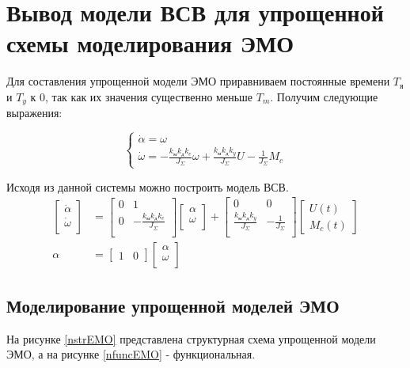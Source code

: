 \documentclass[a4paper, 12pt]{article}
\begin{document}
\section{Вывод модели ВСВ для упрощенной схемы моделирования ЭМО}
Для составления упрощенной модели ЭМО приравниваем постоянные времени $T_\text{я}$ и $T_y$ к 0, так как их значения существенно меньше $T_m$. Получим следующие выражения:

\begin{equation}
\begin{cases}
\dot{\alpha} = \omega \\
\dot{\omega} = -\frac{k_\text{м}k_\text{д}k_e}{J_\Sigma}\omega + \frac{k_\text{м}k_\text{д}k_y}{J_\Sigma}U - \frac{1}{J_\Sigma}M_c
\end{cases}
\end{equation}

Исходя из данной системы можно построить модель ВСВ.
\begin{align}
\begin{bmatrix}
\dot{\alpha} \\
\dot{\omega} \\
\end{bmatrix} & = 
\begin{bmatrix}
0 & 1 \\
0 & -\frac{k_\text{м}k_\text{д}k_e}{J_\Sigma} \\
\end{bmatrix}
\begin{bmatrix}
\alpha \\
\omega \\
\end{bmatrix} + 
\begin{bmatrix}
0 & 0 \\
\frac{k_\text{м}k_\text{д}k_y}{J_\Sigma} & -\frac{1}{J_\Sigma} \\
\end{bmatrix}
\begin{bmatrix}
U(t) \\
M_c(t)
\end{bmatrix} \\
\alpha & = 
\begin{bmatrix}
1 & 0 
\end{bmatrix}
\begin{bmatrix}
\alpha \\
\omega \\
\end{bmatrix}
\end{align}

\newpage
\begin{center}
	\section{Моделирование упрощенной моделей ЭМО}
\end{center}\par
На рисунке \ref{nstrEMO} представлена структурная схема упрощенной модели ЭМО, а на рисунке \ref{nfuncEMO}  - функциональная.
\end{document}
